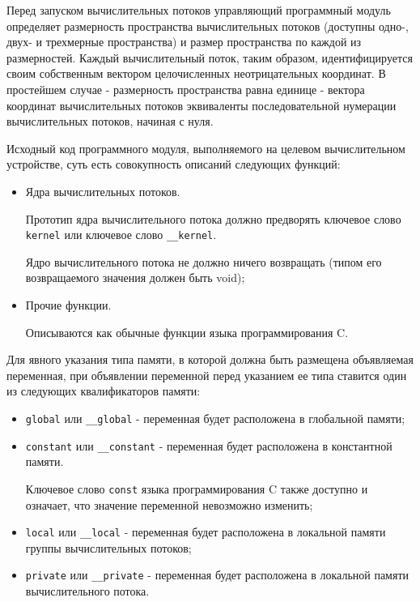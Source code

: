 Перед запуском вычислительных потоков управляющий программный модуль определяет размерность пространства вычислительных потоков (доступны одно-, двух- и трехмерные пространства) и размер пространства по каждой из размерностей. Каждый вычислительный поток, таким образом, идентифицируется своим собственным вектором целочисленных неотрицательных координат. В простейшем случае - размерность пространства равна единице - вектора координат вычислительных потоков эквиваленты последовательной нумерации вычислительных потоков, начиная с нуля.



		Исходный код программного модуля, выполняемого на целевом вычислительном устройстве, суть есть совокупность описаний следующих функций:

		\begin{itemize}

			\item Ядра вычислительных потоков.

				Прототип ядра вычислительного потока должно предворять ключевое слово \verb|kernel| или ключевое слово \verb|__kernel|.

				Ядро вычислительного потока не должно ничего возвращать (типом его возвращаемого значения должен быть void);

			\item Прочие функции.

				Описываются как обычные функции языка программирования C.

		\end{itemize}


		Для явного указания типа памяти, в которой должна быть размещена объявляемая переменная, при объявлении переменной перед указанием ее типа ставится один из следующих квалификаторов памяти:

		\begin{itemize}

			\item \verb|global| или \verb|__global| - переменная будет расположена в глобальной памяти;
			\item \verb|constant| или \verb|__constant| - переменная будет расположена в константной памяти.

			Ключевое слово \verb|const| языка программирования C также доступно и означает, что значение переменной невозможно изменить;

			\item \verb|local| или \verb|__local| - переменная будет расположена в локальной памяти группы вычислительных потоков;
			\item \verb|private| или \verb|__private| - переменная будет расположена в локальной памяти вычислительного потока.

		\end{itemize}

